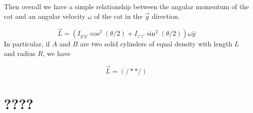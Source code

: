 \documentclass[12]{amsart}
\theoremstyle{definition}
\begin{document}
Then overall we have a simple relationship between the angular momentum of the cat and an angular velocity $\omega$ of the cat in the $\vec{y}$ direction.

\begin{equation}
    \vec{L} = (I_{y'y'} \cos^2(\theta/2) + I_{z'z'} \sin^2(\theta/2))\omega \hat{y}
\end{equation}
In particular, if $A$ and $B$ are two solid cylinders of equal density with length $L$ and radius $R$, we have

\begin{equation}
    \vec{L} = (/**/)
\end{equation}

\section{????}
\end{document}
